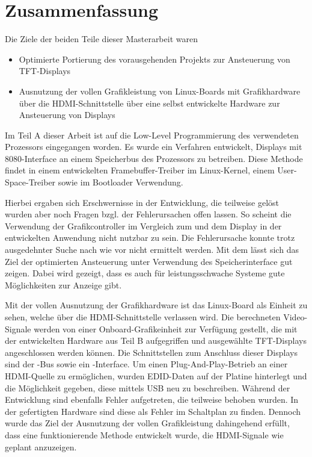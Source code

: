 \chapter{Zusammenfassung}
\label{cha:Zusammenfassung}
Die Ziele der beiden Teile dieser Masterarbeit waren
\begin{itemize}
\item Optimierte Portierung des vorausgehenden Projekts zur Ansteuerung von TFT-Displays
\item Ausnutzung der vollen Grafikleistung von Linux-Boards mit Grafikhardware über die HDMI-Schnittstelle über eine selbst entwickelte Hardware zur Ansteuerung von Displays
\end{itemize}
Im Teil A dieser Arbeit ist auf die Low-Level Programmierung des verwendeten Prozessors  eingegangen worden. Es wurde ein Verfahren entwickelt, Displays mit 8080-Interface an einem Speicherbus des Prozessors zu betreiben. Diese Methode findet in einem entwickelten Framebuffer-Treiber im Linux-Kernel, einem User-Space-Treiber sowie im Bootloader Verwendung.\newline

Hierbei ergaben sich Erschwernisse in der Entwicklung, die teilweise gelöst wurden aber noch Fragen bzgl. der Fehlerursachen offen lassen. 
So scheint die Verwendung der Grafikcontroller  im Vergleich zum  und dem Display  in der entwickelten Anwendung nicht nutzbar zu sein. Die Fehlerursache konnte trotz ausgedehnter Suche nach wie vor nicht ermittelt werden.\newline
Mit dem  lässt sich das Ziel der optimierten Ansteuerung unter Verwendung des Speicherinterface gut zeigen. Dabei wird gezeigt, dass es auch für leistungsschwache Systeme gute Möglichkeiten zur Anzeige gibt.\newline

Mit der vollen Ausnutzung der Grafikhardware ist das Linux-Board als Einheit zu sehen, welche über die HDMI-Schnittstelle verlassen wird. Die berechneten Video-Signale werden von einer Onboard-Grafikeinheit zur Verfügung gestellt, die mit der entwickelten Hardware aus Teil B aufgegriffen und ausgewählte TFT-Displays angeschlossen werden können. Die Schnittstellen zum Anschluss dieser Displays sind der -Bus sowie ein -Interface.\newline
Um einen Plug-And-Play-Betrieb an einer HDMI-Quelle zu ermöglichen, wurden EDID-Daten auf der Platine hinterlegt und die Möglichkeit gegeben, diese mittels USB neu zu beschreiben.\newline
Während der Entwicklung sind ebenfalls Fehler aufgetreten, die teilweise behoben wurden. In der gefertigten Hardware sind diese als Fehler im Schaltplan zu finden.\newline
Dennoch wurde das Ziel der Ausnutzung der vollen Grafikleistung dahingehend erfüllt, dass eine funktionierende Methode entwickelt wurde, die HDMI-Signale wie geplant anzuzeigen.